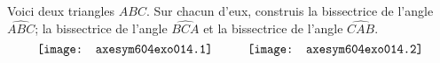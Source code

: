 Voici deux triangles $ABC$. Sur chacun d'eux, construis la bissectrice de l'angle $\widehat{ABC}$; la bissectrice de l'angle $\widehat{BCA}$ et la bissectrice de l'angle $\widehat{CAB}$.
\[\texttt{[image: axesym604exo014.1]}\kern1cm\texttt{[image: axesym604exo014.2]}\]